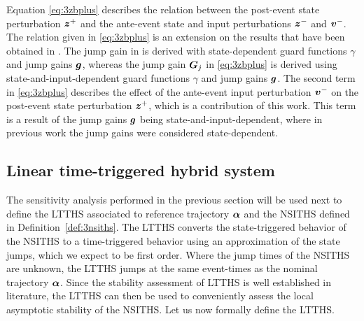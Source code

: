 \documentclass[../DC2019003Bouma.tex]{subfiles}
\begin{document}
Equation \eqref{eq:3zbplus} describes the relation between the post-event state perturbation ${\boldsymbol{z}}^+$ and the ante-event state and input perturbations ${\boldsymbol{z}}^-$ and ${\boldsymbol{v}}^-$. The relation given in \eqref{eq:3zbplus} is an extension on the results that have been obtained in \cite{Rijnen2018}. The jump gain in \cite{Rijnen2018} is derived with state-dependent guard functions $\gamma$ and jump gains ${\boldsymbol{g}}$, whereas the jump gain ${\boldsymbol{G}}_j$ in \eqref{eq:3zbplus} is derived using state-and-input-dependent guard functions $\gamma$ and jump gains ${\boldsymbol{g}}$. The second term in \eqref{eq:3zbplus} describes the effect of the ante-event input perturbation ${\boldsymbol{v}}^-$ on the post-event state perturbation ${\boldsymbol{z}}^+$, which is a contribution of this work. This term is a result of the jump gains ${\boldsymbol{g}}$ being state-and-input-dependent, where in previous work the jump gains were considered state-dependent.

\subsection{Linear time-triggered hybrid system}
The sensitivity analysis performed in the previous section will be used next to define the LTTHS associated to reference trajectory $\boldsymbol{\alpha}$ and the NSITHS defined in Definition~\ref{def:3nsiths}. The LTTHS converts the state-triggered behavior of the NSITHS to a time-triggered behavior using an approximation of the state jumps, which we expect to be first order. Where the jump times of the NSITHS are unknown, the LTTHS jumps at the same event-times as the nominal trajectory $\boldsymbol{\alpha}$. Since the stability assessment of LTTHS is well established in literature, the LTTHS can then be used to conveniently assess the local asymptotic stability of the NSITHS. Let us now formally define the LTTHS.
\end{document}
